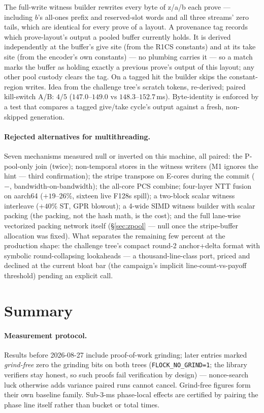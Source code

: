 \documentclass[11pt]{article}
\newcommand{\code}[1]{\texttt{#1}}
\begin{document}
The full-write witness builder rewrites every byte of z/a/b each prove ---
including $b$'s all-ones prefix and reserved-slot words and all three
streams' zero tails, which are identical for every prove of a layout. A
provenance tag records which prove-layout's output a pooled buffer
currently holds. It is derived independently at the buffer's give site
(from the R1CS constants) and at its take site (from the encoder's own
constants) --- no plumbing carries it --- so a match marks the buffer as
holding exactly a previous prove's output of this layout; any other pool
custody clears the tag. On a tagged hit the builder skips the
constant-region writes. Idea from the challenge tree's scratch tokens,
re-derived; paired kill-switch A/B: $4/5$ ($147.0$--$149.0$ vs
$148.3$--$152.7$\,ms). Byte-identity is enforced by a test that compares
a tagged give/take cycle's output against a fresh, non-skipped
generation.

\paragraph{Rejected alternatives for multithreading.}
Seven mechanisms measured null or inverted on this machine, all paired:
the P-pool-only join (twice); non-temporal stores in the witness writers
(M1 ignores the hint --- third confirmation); the stripe transpose on
E-cores during the commit ($-$, bandwidth-on-bandwidth); the all-core PCS
combine; four-layer NTT fusion on aarch64 ($+19$--$26\%$, sixteen live
F128s spill); a two-block scalar witness interleave ($+40\%$ ST, GPR
blowout); a 4-wide SIMD witness builder with scalar packing (the
packing, not the hash math, is the cost); and the full lane-wise
vectorized packing network itself (\S\ref{sec:zpool} --- null once the
stripe-buffer allocation was fixed). What separates the remaining few
percent at the production shape: the challenge tree's compact round-2
anchor+delta format with symbolic round-collapsing lookaheads --- a
thousand-line-class port, priced and declined at the current bloat bar
(the campaign's implicit line-count-vs-payoff threshold) pending an
explicit call.

\section*{Summary}

\paragraph{Measurement protocol.} Results before 2026-08-27 include
proof-of-work grinding; later entries marked \emph{grind-free} zero the
grinding bits on both trees (\code{FLOCK\_NO\_GRIND=1}; the library
verifiers stay honest, so such proofs fail verification by design) —
nonce-search luck otherwise adds variance paired runs cannot cancel.
Grind-free figures form their own baseline family. Sub-3-ms phase-local
effects are certified by pairing the phase line itself rather than
bucket or total times.
\end{document}
